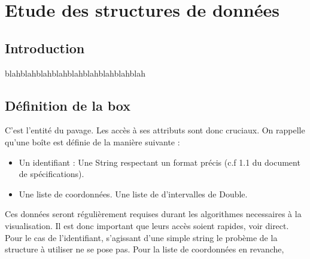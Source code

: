 \chapter{Etude des structures de données}

\section{Introduction}
 blahblahblahblahblahblahblahblahblah
\section{Définition de la box}
C'est l'entité du pavage. Les accès à ses attributs sont donc cruciaux. On rappelle qu'une boîte est définie de la manière suivante : 
\begin{itemize}
 \item 
Un identifiant : Une String respectant un format précis (c.f 1.1 du document de spécifications).
\item
Une liste de coordonnées. Une liste de d'intervalles de Double.
\end{itemize}
Ces données seront régulièrement requises durant les algorithmes necessaires à la visualisation. Il est donc important que leurs accès soient rapides, voir direct. Pour le cas de l'identifiant, s'agissant d'une simple string le probème de la structure à utiliser ne se pose pas. Pour la liste de coordonnées en revanche, 




